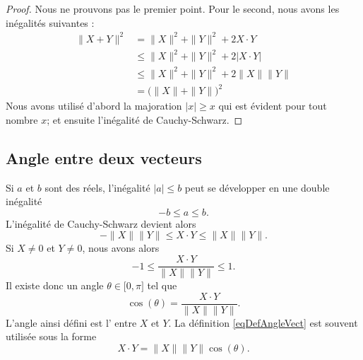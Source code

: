 \begin{proof}
	Nous ne prouvons pas le premier point.
    Pour le second, nous avons les inégalités suivantes :
	\begin{subequations}
		\begin{align}
			\| X+Y \|^2&=\| X \|^2+\| Y \|^2+2X\cdot Y\\
			&\leq\| X \|^2+\| Y \|^2+2|X\cdot Y|\\
			&\leq\| X \|^2+\| Y \|^2+2\| X \|\| Y \|\\
			&=\big( \| X \|+\| Y \| \big)^2
		\end{align}
	\end{subequations}
	Nous avons utilisé d'abord la majoration $| x |\geq x$ qui est évident pour tout nombre $x$; et ensuite l'inégalité de Cauchy-Schwarz.
\end{proof}


\subsection{Angle entre deux vecteurs}

Si $a$ et $b$ sont des réels, l'inégalité $| a |\leq b$ peut se développer en une double inégalité
\begin{equation}
	-b\leq a\leq b.
\end{equation}
L'inégalité de Cauchy-Schwarz devient alors
\begin{equation}
	-\| X \|\| Y \|\leq X\cdot Y\leq\| X \|\| Y \|.
\end{equation}
Si $X\neq 0$ et $Y\neq 0$, nous avons alors
\begin{equation}
	-1\leq\frac{ X\cdot Y }{ \| X \|\| Y \| }\leq 1.
\end{equation}
Il existe donc un angle $\theta\in\mathopen[ 0 , \pi \mathclose]$ tel que
\begin{equation}		\label{eqDefAngleVect}
	\cos(\theta)=\frac{ X\cdot Y }{ \| X \|\| Y \| }.
\end{equation}
L'angle ainsi défini est l' entre $X$ et $Y$. La définition \eqref{eqDefAngleVect} est souvent utilisée sous la forme
\begin{equation}		\label{eqPropCosThet}
	X\cdot Y=\| X \|\| Y \|\cos(\theta).
\end{equation}

